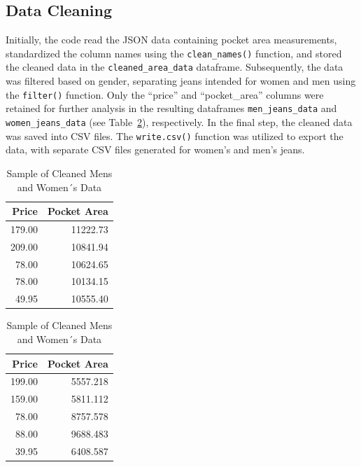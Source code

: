 \documentclass[
  letterpaper,
  DIV=11,
  numbers=noendperiod]{scrartcl}
\begin{document}
\hypertarget{data-cleaning}{%
\subsection{Data Cleaning}\label{data-cleaning}}

Initially, the code read the JSON data containing pocket area
measurements, standardized the column names using the
\texttt{clean\_names()} function, and stored the cleaned data in the
\texttt{cleaned\_area\_data} dataframe. Subsequently, the data was
filtered based on gender, separating jeans intended for women and men
using the \texttt{filter()} function. Only the ``price'' and
``pocket\_area'' columns were retained for further analysis in the
resulting dataframes \texttt{men\_jeans\_data} and
\texttt{women\_jeans\_data} (see Table~\ref{tbl-menwomen_table}),
respectively. In the final step, the cleaned data was saved into CSV
files. The \texttt{write.csv()} function was utilized to export the
data, with separate CSV files generated for women's and men's jeans.

\newpage

\begin{table}

\caption{\label{tbl-menwomen_table}Sample of Cleaned
Men\textquotesingle s and Women´s
Data}\begin{minipage}[t]{0.50\linewidth}

{\centering 

\begin{tabular}[t]{rr}
\toprule
Price & Pocket Area\\
\midrule
179.00 & 11222.73\\
209.00 & 10841.94\\
78.00 & 10624.65\\
78.00 & 10134.15\\
49.95 & 10555.40\\
\bottomrule
\end{tabular}

}

\end{minipage}%
%
\begin{minipage}[t]{0.50\linewidth}

{\centering 

\begin{tabular}[t]{rr}
\toprule
Price & Pocket Area\\
\midrule
199.00 & 5557.218\\
159.00 & 5811.112\\
78.00 & 8757.578\\
88.00 & 9688.483\\
39.95 & 6408.587\\
\bottomrule
\end{tabular}

}

\end{minipage}%

\end{table}
\end{document}
